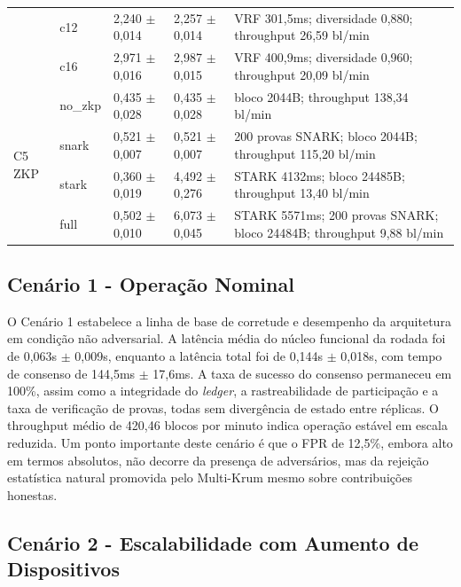 \documentclass[12pt]{article}
\begin{document}
\begin{table}[htbp]
\begin{tabular}{p{1.9cm}p{1.5cm}p{2.1cm}p{2.1cm}p{4.3cm}}
& c12 & 2,240 $\pm$ 0,014 & 2,257 $\pm$ 0,014 & VRF 301,5ms; diversidade 0,880; throughput 26,59 bl/min \\
& c16 & 2,971 $\pm$ 0,016 & 2,987 $\pm$ 0,015 & VRF 400,9ms; diversidade 0,960; throughput 20,09 bl/min \\
\hline
\multirow{4}{*}{C5 ZKP} & no\_zkp & 0,435 $\pm$ 0,028 & 0,435 $\pm$ 0,028 & bloco 2044B; throughput 138,34 bl/min \\
& snark & 0,521 $\pm$ 0,007 & 0,521 $\pm$ 0,007 & 200 provas SNARK; bloco 2044B; throughput 115,20 bl/min \\
& stark & 0,360 $\pm$ 0,019 & 4,492 $\pm$ 0,276 & STARK 4132ms; bloco 24485B; throughput 13,40 bl/min \\
& full & 0,502 $\pm$ 0,010 & 6,073 $\pm$ 0,045 & STARK 5571ms; 200 provas SNARK; bloco 24484B; throughput 9,88 bl/min \\
\hline
\end{tabular}
\end{table}

\subsection{Cenário 1 - Operação Nominal}

O Cenário 1 estabelece a linha de base de corretude e desempenho da arquitetura em condição não adversarial. A latência média do núcleo funcional da rodada foi de 0,063s $\pm$ 0,009s, enquanto a latência total foi de 0,144s $\pm$ 0,018s, com tempo de consenso de 144,5ms $\pm$ 17,6ms. A taxa de sucesso do consenso permaneceu em 100\%, assim como a integridade do \textit{ledger}, a rastreabilidade de participação e a taxa de verificação de provas, todas sem divergência de estado entre réplicas. O throughput médio de 420,46 blocos por minuto indica operação estável em escala reduzida. Um ponto importante deste cenário é que o FPR de 12,5\%, embora alto em termos absolutos, não decorre da presença de adversários, mas da rejeição estatística natural promovida pelo Multi-Krum mesmo sobre contribuições honestas.

\subsection{Cenário 2 - Escalabilidade com Aumento de Dispositivos}
\end{document}
